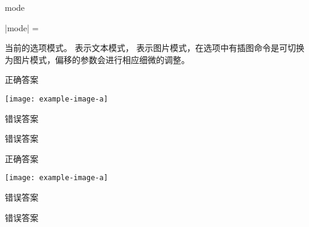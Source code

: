\documentclass{xdyy-usermanual}
\begin{document}
\subsubsection{  }

\begin{function}{mode}
  \begin{syntax}
    |mode| =  
  \end{syntax}
  当前的选项模式。  表示文本模式，  表示图片模式，在选项中有插图命令是可切换为图片模式，偏移的参数会进行相应细微的调整。
\end{function}

\begin{vexample}
    \begin{xchoices}[mode = text, label-pos = bottom-center]
      \item* 正确答案
      \item* \texttt{[image: example-image-a]}
      \item 错误答案
      \item 错误答案
    \end{xchoices}

    \begin{xchoices}[mode = figure, label-pos = bottom-center]
      \item* 正确答案
      \item* \texttt{[image: example-image-a]}
      \item 错误答案
      \item 错误答案
    \end{xchoices}
\end{vexample}
\end{document}
